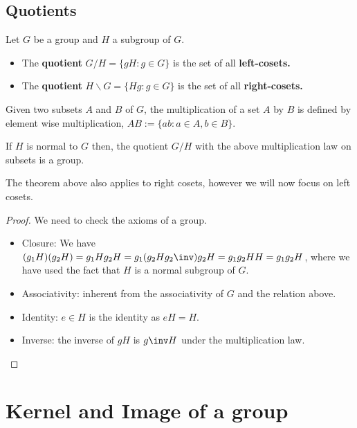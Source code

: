 \documentclass[12pt, a4paper]{article}
\begin{document}
\subsection{Quotients}

\begin{definition}
    Let \(G\) be a group and \(H\) a subgroup of \(G\).
    \begin{itemize}
        \item The \textbf{quotient} \(G/H = \{gH : g \in G\}\) is the set of all \textbf{left-cosets.}
        \item The \textbf{quotient} \(H\backslash G = \{Hg : g\in G\}\) is the set of all \textbf{right-cosets.}
    \end{itemize}
\end{definition}

\begin{definition}
    Given two subsets \(A\) and \(B\) of \(G\), the multiplication of a set \(A\) by \(B\) is defined by element wise multiplication, \(AB:=\{ab : a\in A, b\in B\}.\)
\end{definition}

\begin{mdthm}
    If \(H\) is normal to \(G\) then, the quotient \(G/H\) with the above multiplication law on subsets is a group.
\end{mdthm}

\begin{mdnote}
    The theorem above also applies to right cosets, however we will now focus on left cosets.
\end{mdnote}

\begin{proof}
    We need to check the axioms of a group.
    \begin{itemize}
        \item Closure: We have \((g_1H)(g_2 H)=g_1Hg_2H = g_1(g_2Hg_2\inv)g_2H=g_1g_2HH=g_1g_2H\), where we have used the fact that \(H\) is a normal subgroup of \(G\).
        \item Associativity: inherent from the associativity of \(G\) and the relation above.
        \item Identity: \(e \in H\) is the identity as \(eH=H\). 
        \item Inverse: the inverse of \(gH\) is \(g\inv H\) under the multiplication law.
    \end{itemize}
\end{proof}

\section{Kernel and Image of a group}
\end{document}
